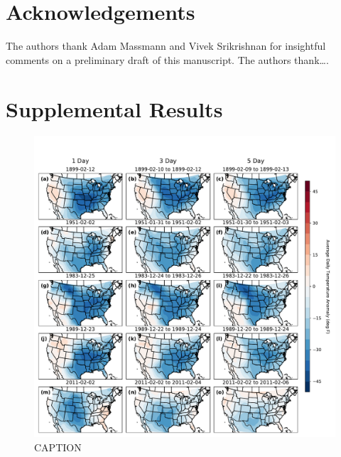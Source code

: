 \documentclass[12pt]{iopart}
\begin{document}
\clearpage
\section*{Acknowledgements}

The authors thank Adam Massmann and Vivek Srikrishnan for insightful comments on a preliminary draft of this manuscript.
The authors thank\ldots.




\clearpage
\section{Supplemental Results}
\renewcommand{\thefigure}{S\arabic{figure}}
\setcounter{figure}{0}

\begin{figure}
  \centering
  \includegraphics[width=\textwidth]{historic_events_bk.pdf}
  \caption{CAPTION}\label{fig:historic_bk}
\end{figure}
\end{document}
